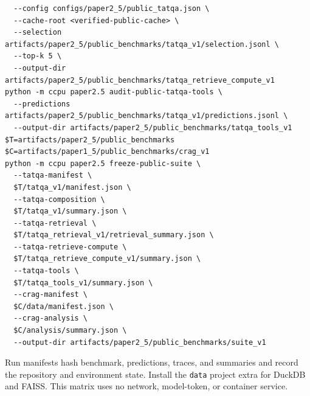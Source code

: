 \documentclass[11pt]{article}
\begin{document}
\begin{verbatim}
  --config configs/paper2_5/public_tatqa.json \
  --cache-root <verified-public-cache> \
  --selection artifacts/paper2_5/public_benchmarks/tatqa_v1/selection.jsonl \
  --top-k 5 \
  --output-dir artifacts/paper2_5/public_benchmarks/tatqa_retrieve_compute_v1
python -m ccpu paper2.5 audit-public-tatqa-tools \
  --predictions artifacts/paper2_5/public_benchmarks/tatqa_v1/predictions.jsonl \
  --output-dir artifacts/paper2_5/public_benchmarks/tatqa_tools_v1
$T=artifacts/paper2_5/public_benchmarks
$C=artifacts/paper1_5/public_benchmarks/crag_v1
python -m ccpu paper2.5 freeze-public-suite \
  --tatqa-manifest \
  $T/tatqa_v1/manifest.json \
  --tatqa-composition \
  $T/tatqa_v1/summary.json \
  --tatqa-retrieval \
  $T/tatqa_retrieval_v1/retrieval_summary.json \
  --tatqa-retrieve-compute \
  $T/tatqa_retrieve_compute_v1/summary.json \
  --tatqa-tools \
  $T/tatqa_tools_v1/summary.json \
  --crag-manifest \
  $C/data/manifest.json \
  --crag-analysis \
  $C/analysis/summary.json \
  --output-dir artifacts/paper2_5/public_benchmarks/suite_v1
\end{verbatim}
Run manifests hash benchmark, predictions, traces, and summaries and record the
repository and environment state. Install the \texttt{data} project extra for
DuckDB and FAISS. This matrix uses no network, model-token, or container service.
\end{document}
